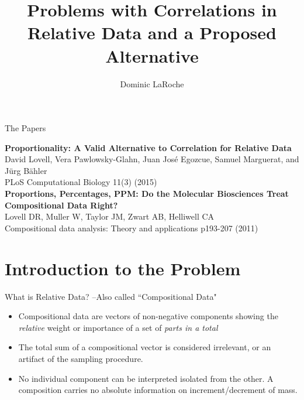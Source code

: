 \documentclass{beamer}\usepackage[]{graphicx}\usepackage[]{color}
\title[Correlation in Relative Data]{Problems with Correlations in Relative Data and a Proposed Alternative}
\author[Dominic LaRoche]{Dominic LaRoche}
\begin{document}
\maketitle

\begin{frame}{The Papers}
\begin{center}
\large{\textbf{Proportionality: A Valid Alternative to Correlation for Relative Data}}\\
\small{David Lovell, Vera Pawlowsky-Glahn, Juan José Egozcue, Samuel Marguerat, and Jürg Bähler\\
PLoS Computational Biology 11(3) (2015)}\\

\bigskip
\large{\textbf{Proportions, Percentages, PPM: Do the Molecular Biosciences Treat Compositional Data Right?}}\\
\small{Lovell DR, Muller W, Taylor JM, Zwart AB, Helliwell CA\\
Compositional data analysis: Theory and applications p193-207 (2011)}
\end{center}
\end{frame}


\section{Introduction to the Problem}

\begin{frame}{What is Relative Data? --Also called ``Compositional Data"}
\begin{itemize}
\item Compositional data are vectors of non-negative components showing the \emph{relative} weight or importance of a set of \emph{parts in a total}
\bigskip
\item The total sum of a compositional vector is considered irrelevant, or an artifact of the sampling procedure.
\bigskip
\item No individual component can be interpreted isolated from the other. A composition carries no absolute information on increment/decrement of mass.
\end{itemize}
\end{frame}
\end{document}
